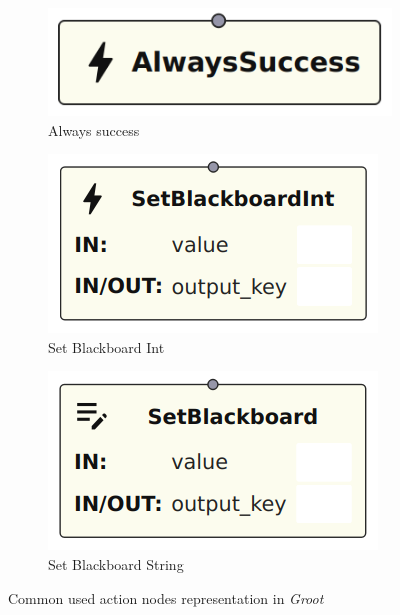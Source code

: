 \begin{figure}[!h]
    \centering
    \begin{subfigure}[b]{.32\linewidth}
        \centering
        \includegraphics[width=0.7\linewidth]{chapters/development/images/AlwaysSuccessNode.png}
        \caption{Always success}
    \end{subfigure}
    \hfill
    \begin{subfigure}[b]{.32\linewidth}
        \centering
        \includegraphics[width=0.85\linewidth]{chapters/development/images/SetBlackboardIntNode.png}
        \caption{Set Blackboard Int}
        \label{fig:set_blackboard_int_impl}
    \end{subfigure}
    \hfill
    \begin{subfigure}[b]{.32\linewidth}
        \centering
        \includegraphics[width=0.85\linewidth]{chapters/development/images/SetBlackboardStringNode.png}
        \caption{Set Blackboard String}
        \label{fig:set_blackboard_string_impl}
    \end{subfigure}
    \caption{Common used action nodes representation in \textit{Groot}}
    \label{fig:common_action_node_impl}
\end{figure}

